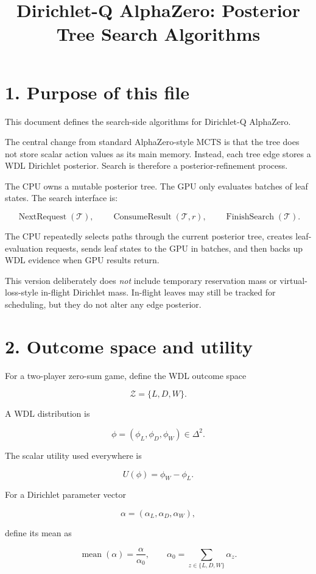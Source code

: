 \documentclass[11pt]{article}
\title{Dirichlet-Q AlphaZero: Posterior Tree Search Algorithms}
\author{}
\date{}
\newcommand{\mean}{\operatorname{mean}}
\newcommand{\Tree}{\mathcal{T}}
\newcommand{\Z}{\mathcal{Z}}
\newcommand{\Utility}{U}
\newcommand{\NextRequest}{\operatorname{NextRequest}}
\newcommand{\ConsumeResult}{\operatorname{ConsumeResult}}
\newcommand{\FinishSearch}{\operatorname{FinishSearch}}
\begin{document}
\maketitle

\section*{1. Purpose of this file}

This document defines the search-side algorithms for Dirichlet-Q AlphaZero.

The central change from standard AlphaZero-style MCTS is that the tree does not
store scalar action values as its main memory. Instead, each tree edge stores a
WDL Dirichlet posterior. Search is therefore a posterior-refinement process.

The CPU owns a mutable posterior tree. The GPU only evaluates batches of leaf
states. The search interface is:

\[
\NextRequest(\Tree),
\qquad
\ConsumeResult(\Tree,r),
\qquad
\FinishSearch(\Tree).
\]

The CPU repeatedly selects paths through the current posterior tree, creates
leaf-evaluation requests, sends leaf states to the GPU in batches, and then backs
up WDL evidence when GPU results return.

This version deliberately does \emph{not} include temporary reservation mass or
virtual-loss-style in-flight Dirichlet mass. In-flight leaves may still be tracked
for scheduling, but they do not alter any edge posterior.

\section*{2. Outcome space and utility}

For a two-player zero-sum game, define the WDL outcome space

\[
\Z = \{L,D,W\}.
\]

A WDL distribution is

\[
\phi = (\phi_L,\phi_D,\phi_W) \in \Delta^2.
\]

The scalar utility used everywhere is

\[
\Utility(\phi) = \phi_W - \phi_L.
\]

For a Dirichlet parameter vector

\[
\alpha = (\alpha_L,\alpha_D,\alpha_W),
\]

define its mean as

\[
\mean(\alpha)
=
\frac{\alpha}{\alpha_0},
\qquad
\alpha_0 = \sum_{z \in \{L,D,W\}} \alpha_z.
\]
\end{document}
